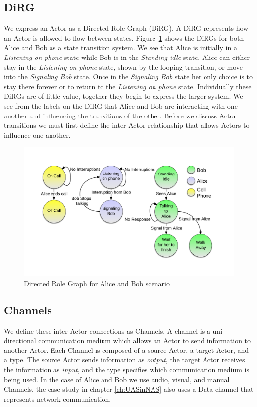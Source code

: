 \subsection{DiRG}
We express an Actor as a Directed Role Graph (DiRG).  A DiRG represents how an Actor is allowed to flow between states.  Figure~\ref{fig:ab_dirg} shows the DiRGs for both Alice and Bob as a state transition system.  We see that Alice is initially in a {\em Listening on phone} state while Bob is in the {\em Standing idle} state.  Alice can either stay in the {\em Listening on phone} state, shown by the looping transition, or move into the {\em Signaling Bob} state.  Once in the {\em Signaling Bob} state her only choice is to stay there forever or to return to the {\em Listening on phone} state.  Individually these DiRGs are of little value, together they begin to express the larger system.  We see from the labels on the DiRG that Alice and Bob are interacting with one another and influencing the transitions of the other.  Before we discuss Actor transitions we must first define the inter-Actor relationship that allows Actors to influence one another.

\begin{figure}[h]
\begin{center}
\includegraphics[width=\textwidth]{ab_dirg.png}
\caption{Directed Role Graph for Alice and Bob scenario}
\label{fig:ab_dirg}
\end{center}
\end{figure}

\subsection{Channels}
We define these inter-Actor connections as Channels.  A channel is a uni-directional communication medium which allows an Actor to send information to another Actor.  Each Channel is composed of a source Actor, a target Actor, and a type.  The source Actor sends information as {\em output}, the target Actor receives the information as {\em input}, and the type specifies which communication medium is being used.  In the case of Alice and Bob we use audio, visual, and manual Channels\cite{wickens2002multiple}, the case study in chapter \ref{ch:UASinNAS} also uses a Data channel that represents network communication.  


